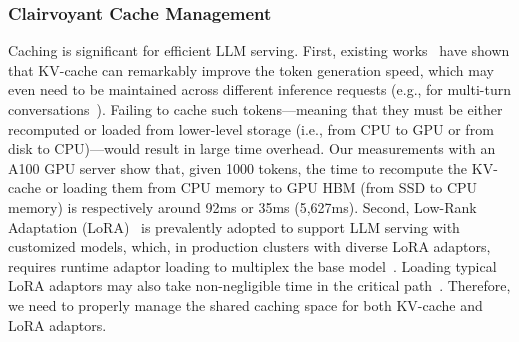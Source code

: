 

    \vspace{-0.1in}
\subsubsection{Clairvoyant Cache Management}
\label{subsubsec:cache}
Caching is significant for efficient LLM serving. 
First, existing works~\cite{kwon2023efficient,abhyankarinfercept} have shown that KV-cache can remarkably improve the token generation speed, which may even need to be maintained across different inference requests (e.g., for multi-turn conversations~\cite{gao2024cost}).
Failing to cache such tokens---meaning that they must be either recomputed or loaded from lower-level storage (i.e., from CPU to GPU or from disk to CPU)---would result in large time overhead. 
Our measurements with an A100 GPU server show that, given 1000 tokens, the time to recompute the KV-cache or loading them from CPU memory to GPU HBM (from SSD to CPU memory) is respectively around 92ms or 35ms (5,627ms). 
Second, Low-Rank Adaptation (LoRA)~\cite{hu2021lora} is prevalently adopted to support LLM serving with customized models, which, in production clusters with diverse LoRA adaptors, requires runtime adaptor loading to multiplex the base model~\cite{sheng2023s}.
Loading typical LoRA adaptors may also take non-negligible time in the critical path~\cite{li2024caraserve}. 
Therefore, we need to properly manage the shared caching space for both KV-cache and LoRA adaptors.

